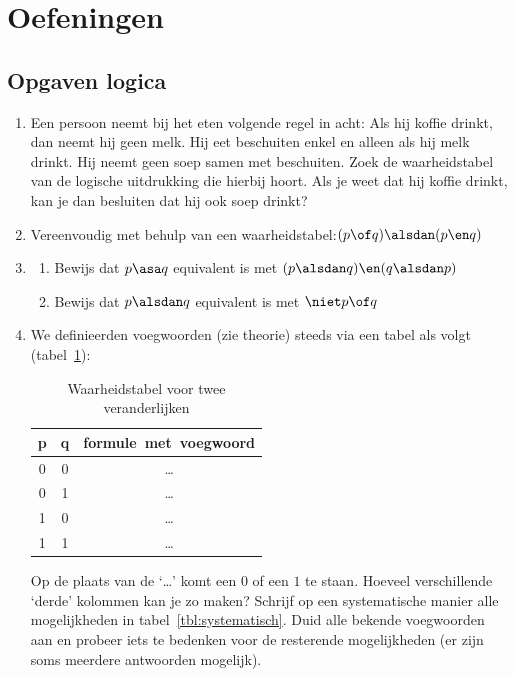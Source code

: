 \section{Oefeningen}
\subsection{Opgaven logica}
\begin{enumerate}
\item Een persoon neemt bij het eten volgende regel in acht:
Als hij koffie drinkt, dan neemt hij geen melk.
Hij eet beschuiten enkel en alleen als hij melk drinkt.
Hij neemt geen soep samen met beschuiten.
Zoek de waarheidstabel van de logische uitdrukking die hierbij hoort. 
Als je weet dat hij koffie drinkt, kan je dan besluiten dat hij ook soep drinkt?
\item Vereenvoudig met behulp van een waarheidstabel:$(p \of q) \alsdan (p \en q)$
\item \begin{enumerate}
\item Bewijs dat $p \asa q$ equivalent is met $(p \alsdan q) \en (q \alsdan p)$
\item Bewijs dat $p \alsdan q$ equivalent is met $\niet p \of q$
\end{enumerate}
\item We definieerden voegwoorden (zie theorie) steeds via een tabel als volgt (tabel~\ref{tbl:voegwo}):
\begin{table}[htb]
  \centering
\begin{tabular}{|c|c|c|}
\hline
p  & q  & \mbox{formule met voegwoord} \\ \hline \hline
0  & 0   & \ldots \\
0  & 1 & \ldots \\ 
1  & 0 & \ldots \\
1  & 1 & \ldots \\
\hline
\end{tabular}
  \caption{Waarheidstabel voor twee veranderlijken}\label{tbl:voegwo}
\end{table}
Op de plaats van de `\ldots' komt een $0$ of een $1$ te staan. Hoeveel verschillende `derde' kolommen kan je zo maken? Schrijf op een systematische manier alle mogelijkheden in tabel~\ref{tbl:systematisch}. Duid alle bekende voegwoorden aan en probeer iets te bedenken voor de resterende mogelijkheden (er zijn soms meerdere antwoorden mogelijk).
\begin{table}[htb]
  \centering
\begin{tabular}{|c|c|p{0.3cm}|p{0.3cm}|p{0.3cm}|p{0.3cm}|p{0.3cm}|p{0.3cm}|p{0.3cm}|p{0.3cm}|p{0.3cm}|p{0.3cm}|p{0.3cm}|p{0.3cm}|p{0.3cm}|p{0.3cm}|p{0.3cm}|p{0.3cm}|}

\end{tabular}
\end{table}
\end{enumerate}
